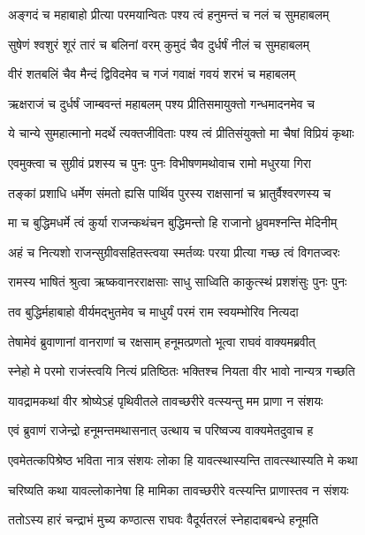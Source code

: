 \twolineshloka
{अङ्गदं च महाबाहो प्रीत्या परमयान्वितः}
{पश्य त्वं हनुमन्तं च नलं च सुमहाबलम्} %

\twolineshloka
{सुषेणं श्वशुरं शूरं तारं च बलिनां वरम्}
{कुमुदं चैव दुर्धर्षं नीलं च सुमहाबलम्} %

\twolineshloka
{वीरं शतबलिं चैव मैन्दं द्विविदमेव च}
{गजं गवाक्षं गवयं शरभं च महाबलम्} %

\twolineshloka
{ऋक्षराजं च दुर्धर्षं जाम्बवन्तं महाबलम्}
{पश्य प्रीतिसमायुक्तो गन्धमादनमेव च} %

\twolineshloka
{ये चान्ये सुमहात्मानो मदर्थे त्यक्तजीविताः}
{पश्य त्वं प्रीतिसंयुक्तो मा चैषां विप्रियं कृथाः} %

\twolineshloka
{एवमुक्त्वा च सुग्रीवं प्रशस्य च पुनः पुनः}
{विभीषणमथोवाच रामो मधुरया गिरा} %

\twolineshloka
{तङ्कां प्रशाधि धर्मेण संमतो ह्यसि पार्थिव}
{पुरस्य राक्षसानां च भ्रातुर्वैश्वरणस्य च} %

\twolineshloka
{मा च बुद्धिमधर्मे त्वं कुर्या राजन्कथंचन}
{बुद्धिमन्तो हि राजानो ध्रुवमश्नन्ति मेदिनीम्} %

\twolineshloka
{अहं च नित्यशो राजन्सुग्रीवसहितस्त्वया}
{स्मर्तव्यः परया प्रीत्या गच्छ त्वं विगतज्वरः} %

\twolineshloka
{रामस्य भाषितं श्रुत्वा ऋष्कवानरराक्षसाः}
{साधु साध्विति काकुत्स्थं प्रशशंसुः पुनः पुनः} %

\twolineshloka
{तव बुद्धिर्महाबाहो वीर्यमद्भुतमेव च}
{माधुर्यं परमं राम स्वयम्भोरिव नित्यदा} %

\twolineshloka
{तेषामेवं ब्रुवाणानां वानराणां च रक्षसाम्}
{हनूमत्प्रणतो भूत्वा राघवं वाक्यमब्रवीत्} %

\twolineshloka
{स्नेहो मे परमो राजंस्त्वयि नित्यं प्रतिष्ठितः}
{भक्तिश्च नियता वीर भावो नान्यत्र गच्छति} %

\twolineshloka
{यावद्रामकथां वीर श्रोष्येऽहं पृथिवीतले}
{तावच्छरीरे वत्स्यन्तु मम प्राणा न संशयः} %

\twolineshloka
{एवं ब्रुवाणं राजेन्द्रो हनूमन्तमथासनात्}
{उत्थाय च परिष्वज्य वाक्यमेतदुवाच ह} %

\twolineshloka
{एवमेतत्कपिश्रेष्ठ भविता नात्र संशयः}
{लोका हि यावत्स्थास्यन्ति तावत्स्थास्यति मे कथा} %

\twolineshloka
{चरिष्यति कथा यावल्लोकानेषा हि मामिका}
{तावच्छरीरे वत्स्यन्ति प्राणास्तव न संशयः} %

\twolineshloka
{ततोऽस्य हारं चन्द्राभं मुच्य कण्ठात्स राघवः}
{वैदूर्यतरलं स्नेहादाबबन्धे हनूमति} %

